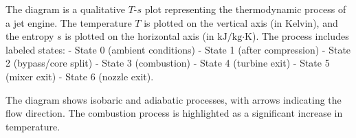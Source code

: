 The diagram is a qualitative \( T \)-\( s \) plot representing the thermodynamic process of a jet engine. The temperature \( T \) is plotted on the vertical axis (in Kelvin), and the entropy \( s \) is plotted on the horizontal axis (in \( \text{kJ}/\text{kg·K} \)). The process includes labeled states:  
- State 0 (ambient conditions)  
- State 1 (after compression)  
- State 2 (bypass/core split)  
- State 3 (combustion)  
- State 4 (turbine exit)  
- State 5 (mixer exit)  
- State 6 (nozzle exit).  

The diagram shows isobaric and adiabatic processes, with arrows indicating the flow direction. The combustion process is highlighted as a significant increase in temperature.